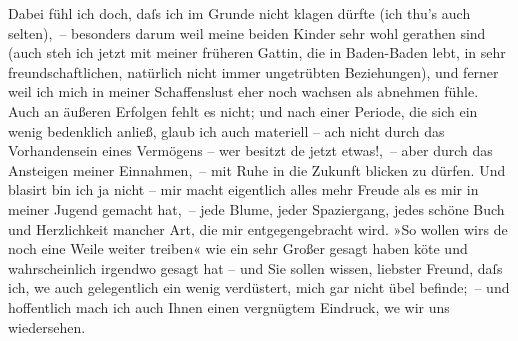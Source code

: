 \pstart
           Dabei fühl ich doch, daſs ich im Grunde nicht klagen dürfte (ich thu’s auch
               selten), – besonders darum weil meine beiden Kinder sehr wohl gerathen sind
               (auch steh ich jetzt mit meiner früheren Gattin, die in Baden-Baden lebt, in sehr freundschaftlichen, natürlich nicht immer unge{\pb}trübten Beziehungen), und ferner weil ich mich in
               meiner Schaffenslust eher noch wachsen als abnehmen fühle. Auch an äußeren Erfolgen
               fehlt es nicht; und nach einer Periode, die sich ein wenig bedenklich anließ, glaub
               ich auch materiell – ach nicht durch das Vorhandensein eines Vermögens – wer besitzt
                  de{\geminationn} jetzt etwas!, – aber durch das Ansteigen meiner
               Einnahmen, – mit Ruhe in die Zukunft blicken zu dürfen. Und blasirt bin ich ja nicht
               – mir macht eigentlich alles mehr Freude als es mir in meiner Jugend gemacht hat, –
               jede Blume, jeder Spaziergang, jedes schöne Buch und Herzlichkeit mancher Art, die
               mir entgegengebracht wird. »So wollen wirs de{\geminationn} noch eine
               Weile weiter treiben« wie ein sehr Großer gesagt haben kö{\geminationn}te und wahrscheinlich irgendwo gesagt hat – und Sie sollen wissen, liebster Freund,
               daſs ich, we{\geminationn} auch gelegentlich ein wenig verdüstert,
                  {\pb}mich gar nicht übel befinde; – und hoffentlich
               mach ich auch Ihnen einen vergnügtem Eindruck, we{\geminationn} wir
               uns wiedersehen.\pend
           
